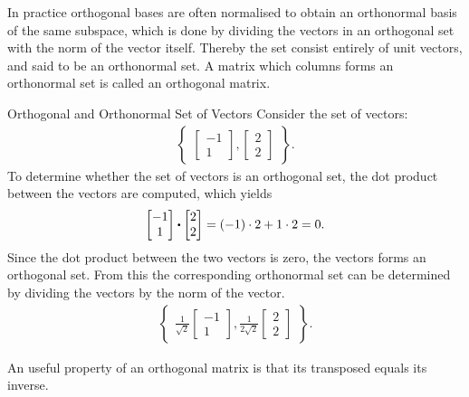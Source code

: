 In practice orthogonal bases are often normalised to obtain an orthonormal basis of the same subspace, which is done by dividing the vectors in an orthogonal set with the norm of the vector itself. Thereby the set consist entirely of unit vectors, and said to be an orthonormal set. A matrix which columns forms an orthonormal set is called an orthogonal matrix.

\begin{example}{Orthogonal and Orthonormal Set of Vectors}
    Consider the set of vectors:
    \begin{align*}
    \begin{Bmatrix}
    \begin{bmatrix}
        -1\\1
    \end{bmatrix},
    \begin{bmatrix}
        2\\2
    \end{bmatrix}
    \end{Bmatrix}.
    \end{align*}
    To determine whether the set of vectors is an orthogonal set, the dot product between the vectors are computed, which yields
    \begin{align*}
    \begin{bmatrix}
        -1\\1
    \end{bmatrix}\vprik
    \begin{bmatrix}
        2\\2
    \end{bmatrix}=(-1)\cdot2+1\cdot2=0.
    \end{align*}
    Since the dot product between the two vectors is zero, the vectors forms an orthogonal set.
    From this the corresponding orthonormal set can be determined by dividing the vectors by the norm of the vector. 
    \begin{align*}
    \begin{Bmatrix}
    \frac{1}{\sqrt{2}}
    \begin{bmatrix}
        -1\\1
    \end{bmatrix},
    \frac{1}{2\sqrt{2}}
    \begin{bmatrix}
        2\\2
    \end{bmatrix}
    \end{Bmatrix}.
    \end{align*}
\end{example}
An useful property of an orthogonal matrix is that its transposed equals its inverse. 

